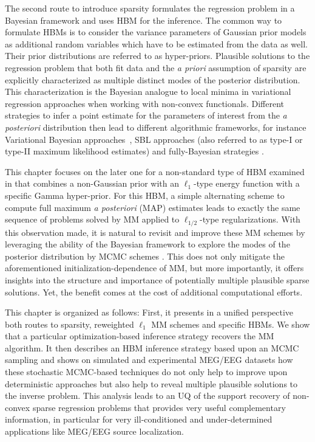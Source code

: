 The second route to introduce sparsity formulates the regression problem in a Bayesian framework and uses \ac{HBM} \cite{mackay2003information} for the inference.
The common way to formulate HBMs is to consider the variance parameters of Gaussian prior models as additional random variables which have to be estimated from the data as well. Their prior distributions are referred to as hyper-priors. Plausible solutions to the regression problem that both fit data and the \emph{a priori} assumption of sparsity are explicitly characterized as multiple distinct modes of the posterior distribution. This characterization is the Bayesian analogue to local minima in variational regression approaches when working with non-convex functionals. Different strategies to infer a point estimate for the parameters of interest from the \emph{a posteriori} distribution then lead to different algorithmic frameworks, for instance Variational Bayesian approaches~\cite{mackay2003information,jordan1999introduction,sato2004hierarchical,FrHaDaKiPhTrHeFlMa08,shervashidze2015learning}, \ac{SBL} approaches (also referred to as type-I or type-II maximum likelihood estimates) \cite{tipping2001sparse,wipf2004sparse,Wipf-Nagarajan:2009,zhang2011sparse} and fully-Bayesian strategies \cite{CaHaPuSo09,Lucka-etal:2012}.

This chapter focuses on the later one for a non-standard type of \ac{HBM} examined in \cite{Lu14} that combines a non-Gaussian prior with an $\ell_{1}$-type energy function with a specific Gamma hyper-prior.
For this \ac{HBM}, a simple alternating scheme to compute full maximum \emph{a posteriori} (MAP) estimates leads to exactly the same sequence of problems solved by \ac{MM} applied to $\ell_{1/2}$-type regularizations.
With this observation made, it is natural to revisit and improve these \ac{MM} schemes by leveraging the ability of the Bayesian framework to explore the modes of the posterior distribution by \ac{MCMC} schemes \cite{RoCa05,KaSo05}. This does not only mitigate the aforementioned initialization-dependence of \ac{MM}, but more importantly, it offers insights into the structure and importance of potentially multiple plausible sparse solutions. Yet, the benefit comes at the cost of additional computational efforts.

This chapter is organized as follows: First, it presents in a unified
perspective both routes to sparsity, \textit{\ie} reweighted $\ell_1$ MM schemes
and specific HBMs. We show that a particular optimization-based inference strategy recovers the MM algorithm. It then describes an \ac{HBM} inference strategy based upon an \ac{MCMC} sampling and shows on simulated and experimental MEG/EEG datasets how these stochastic \ac{MCMC}-based techniques do not only help to improve upon deterministic approaches but also help to reveal multiple plausible solutions to the inverse problem. This analysis leads to an \ac{UQ} of the support recovery of non-convex sparse regression problems that provides very useful complementary information, in particular for very ill-conditioned and under-determined applications like MEG/EEG source localization.

